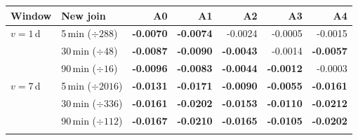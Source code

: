 \begin{tabular}{@{}llrrrrr@{}}
\toprule
Window & New join & A0 & A1 & A2 & A3 & A4\\
\midrule
$v=1$\,d & 5\,min ($\div288$) & \textbf{-0.0070} & \textbf{-0.0074} & -0.0024 & -0.0005 & -0.0015\\
 & 30\,min ($\div48$) & \textbf{-0.0087} & \textbf{-0.0090} & \textbf{-0.0043} & -0.0014 & \textbf{-0.0057}\\
 & 90\,min ($\div16$) & \textbf{-0.0096} & \textbf{-0.0083} & \textbf{-0.0044} & \textbf{-0.0012} & -0.0003\\
\addlinespace
$v=7$\,d & 5\,min ($\div2016$) & \textbf{-0.0131} & \textbf{-0.0171} & \textbf{-0.0090} & \textbf{-0.0055} & \textbf{-0.0161}\\
 & 30\,min ($\div336$) & \textbf{-0.0161} & \textbf{-0.0202} & \textbf{-0.0153} & \textbf{-0.0110} & \textbf{-0.0212}\\
 & 90\,min ($\div112$) & \textbf{-0.0167} & \textbf{-0.0210} & \textbf{-0.0165} & \textbf{-0.0105} & \textbf{-0.0202}\\
\addlinespace
\bottomrule
\end{tabular}
